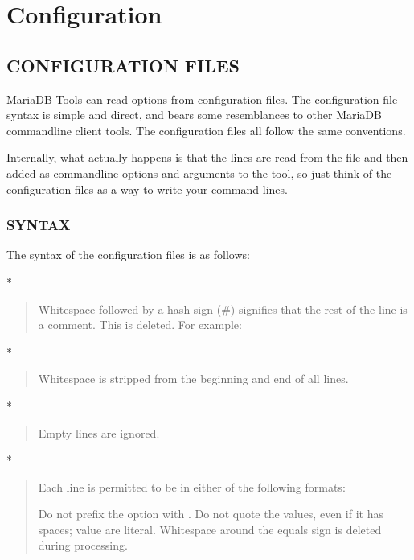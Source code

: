 \documentclass[letterpaper,10pt,english]{sphinxmanual}
\begin{document}
\part{Configuration}
\label{\detokenize{index:configuration}}

\chapter{CONFIGURATION FILES}
\label{\detokenize{configuration_files:configuration-files}}\label{\detokenize{configuration_files::doc}}
MariaDB Tools can read options from configuration files.  The
configuration file syntax is simple and direct, and bears some resemblances
to other MariaDB command\sphinxhyphen{}line client tools.  The configuration files all follow
the same conventions.

Internally, what actually happens is that the lines are read from the file and
then added as command\sphinxhyphen{}line options and arguments to the tool, so just
think of the configuration files as a way to write your command lines.


\section{SYNTAX}
\label{\detokenize{configuration_files:syntax}}
The syntax of the configuration files is as follows:

*
\begin{quote}

Whitespace followed by a hash sign (\#) signifies that the rest of the line is a
comment.  This is deleted.  For example:
\end{quote}

*
\begin{quote}

Whitespace is stripped from the beginning and end of all lines.
\end{quote}

*
\begin{quote}

Empty lines are ignored.
\end{quote}

*
\begin{quote}

Each line is permitted to be in either of the following formats:

\begin{sphinxVerbatim}[commandchars=\\\{\}]
\end{sphinxVerbatim}

Do not prefix the option with \sphinxcode{\sphinxupquote{\sphinxhyphen{}\sphinxhyphen{}}}.  Do not quote the values, even if
it has spaces; value are literal.  Whitespace around the equals sign is
deleted during processing.
\end{quote}
\end{document}
